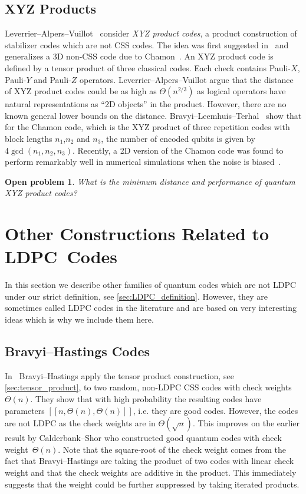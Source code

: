 \documentclass[amsmath, amssymb, floatfix, reprint, twocolumn, notitlepage, 10pt]{revtex4-1}
\newtheorem*{oproblem}{Open problem}
\begin{document}
\subsection{XYZ Products}
%
Leverrier--Alpers--Vuillot~\cite{leverrier2020quantum} consider \emph{XYZ product codes}, a product construction of stabilizer codes which are not CSS codes. 
The idea was first suggested in~\cite{maurice2014codes} and generalizes a 3D non-CSS code due to Chamon~\cite{chamon2005quantum,bravyi2011topological}.
An XYZ product code is defined by a tensor product of three classical codes.
Each check contains Pauli-$X$, Pauli-$Y$ and Pauli-$Z$ operators.
Leverrier--Alpers--Vuillot argue that the distance of XYZ product codes could be as high as $\Theta(n^{2/3})$ as logical operators have natural representations as ``2D objects'' in the product.
However, there are no known general lower bounds on the distance.
Bravyi--Leemhuis--Terhal~\cite{bravyi2011topological} show that for the Chamon code, which is the XYZ product of three repetition codes with block lengths $n_1$,$n_2$ and $n_3$, the number of encoded qubits is given by $4 \gcd (n_1,n_2,n_3)$.
Recently, a 2D version of the Chamon code was found to perform remarkably well in numerical simulations when the noise is biased~\cite{bonilla2020xzzx}.

\begin{oproblem}
What is the minimum distance and performance of quantum XYZ product codes?
\end{oproblem}


\section{Other Constructions Related to LDPC~Codes}\label{sec:nonLDPC}
In this section we describe other families of quantum codes which are not LDPC under our strict definition, see \cref{sec:LDPC_definition}.
However, they are sometimes called LDPC codes in the literature and are based on very interesting ideas which is why we include them here.


\subsection{Bravyi--Hastings Codes}
In~\cite{bravyi2014homological} Bravyi--Hastings apply the tensor product construction, see \cref{sec:tensor_product}, to two random, non-LDPC CSS codes with check weights~$\Theta(n)$.
They show that with high probability the resulting codes have parameters $[[n,\Theta(n),\Theta(n)]]$, i.e. they are good codes.
However, the codes are not LDPC as the check weights are in $\Theta(\sqrt{n})$.
This improves on the earlier result by Calderbank--Shor \cite{calderbank1996good} who constructed good quantum codes with check weight~$\Theta(n)$.
Note that the square-root of the check weight comes from the fact that Bravyi--Hastings are taking the product of two codes with linear check weight and that the check weights are additive in the product.
This immediately suggests that the weight could be further suppressed by taking iterated products.
\end{document}
